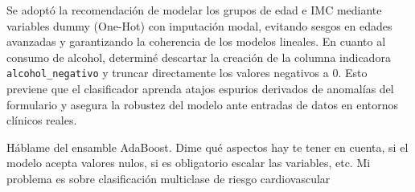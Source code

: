 \documentclass[12pt,a4paper,oneside]{book}
\begin{document}
\begin{iaanalisis}
Se adoptó la recomendación de modelar los grupos de edad e IMC mediante variables dummy (One-Hot) con imputación modal, evitando sesgos en edades avanzadas y garantizando la coherencia de los modelos lineales. En cuanto al consumo de alcohol, determiné descartar la creación de la columna indicadora \texttt{alcohol\_negativo} y truncar directamente los valores negativos a 0. Esto previene que el clasificador aprenda atajos espurios derivados de anomalías del formulario y asegura la robustez del modelo ante entradas de datos en entornos clínicos reales.
\end{iaanalisis}





\begin{iaprompt}
Háblame del ensamble AdaBoost. Dime qué aspectos hay te tener en cuenta, si el modelo acepta valores nulos, si es obligatorio escalar las variables, etc. Mi problema es sobre clasificación multiclase de riesgo cardiovascular
\end{iaprompt}
\end{document}
